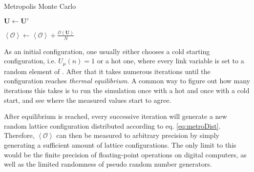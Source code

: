\begin{algorithm}[!htb]
 \caption{Metropolis Monte Carlo}
 \label{alg:metroMonte}
 \begin{algorithmic}[1]
  \STATE {}

  \STATE {}
  \STATE {}
  \label{code:metroMonteIfCond}
  \STATE {}
  \STATE $\boldsymbol{U} \leftarrow \boldsymbol{U}'$
  \ENDIF

  \ENDFOR
  \STATE $\left\langle \mathcal{O} \right\rangle \leftarrow \left\langle \mathcal{O} \right\rangle + \frac{\mathcal{O}(\boldsymbol{U})}{N} $
  \ENDFOR
 \end{algorithmic}
\end{algorithm}
As an initial configuration, one usually either chooses a cold starting configuration, i.e. {$U_\mu(n)=1$} or a hot one, where every link variable is set to a random element of \SUTwo. After that it takes numerous iterations until the configuration reaches \emph{thermal equilibrium}. A common way to figure out how many iterations this takes is to run the simulation once with a hot and once with a cold start, and see where the measured values start to agree.

After equilibrium is reached, every successive iteration will generate a new random lattice configuration distributed according to eq. \ref{eq:metroDist}. Therefore, $\left\langle \mathcal{O} \right\rangle$ can then be measured to arbitrary precision by simply generating a sufficient amount of lattice configurations. The only limit to this would be the finite precision of floating-point operations on digital computers, as well as the limited randomness of pseudo random number generators.


